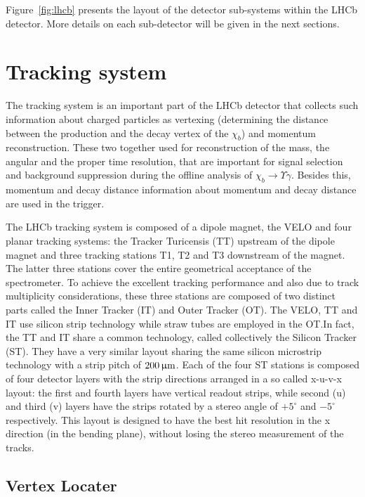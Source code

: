 Figure~\ref{fig:lhcb} presents the layout of the detector sub-systems 
within the LHCb detector. More details on each sub-detector will be given in 
the next sections.

\section{Tracking system}

The tracking system is an important part of the LHCb detector that collects such
information about charged particles as vertexing (determining the distance
between the production and the decay vertex of the $\chi_b$) and
momentum reconstruction. These two together used for reconstruction of the mass,
the angular and the proper time resolution, that are important for signal
selection and background suppression during the offline analysis of
$\chi_b \rightarrow \Upsilon \gamma$. Besides this, momentum and decay distance
information about momentum and decay distance are used in the trigger.

The LHCb tracking system is composed of a dipole magnet, the VELO and four 
planar tracking systems: the Tracker Turicensis (TT) upstream of the dipole 
magnet and three tracking stations T1, T2 and T3 downstream of the magnet. 
The latter three stations cover the entire geometrical acceptance of the 
spectrometer. To achieve the excellent tracking performance and also due to 
track multiplicity considerations, these three stations are composed of two 
distinct parts called the Inner Tracker (IT) and Outer Tracker (OT). 
The VELO, TT and IT use silicon strip technology while straw tubes are 
employed in the OT.\@ In fact, the TT and IT share a common technology, 
called collectively the Silicon Tracker (ST). They have a very similar layout
sharing the same silicon microstrip technology with a strip pitch
of $200{\,\upmu\rm m}$. Each of the four ST stations is composed of four detector 
layers with the strip directions arranged in a so called x-u-v-x layout: 
the first and fourth layers have vertical readout strips, while second (u) 
and third (v) layers have the strips rotated by a stereo angle of $+5^\circ$ 
and $-5^\circ$ respectively. This layout is designed to have the best hit
resolution in the x direction (in the bending plane), without losing the 
stereo measurement of the tracks.

\subsection{Vertex Locater}

